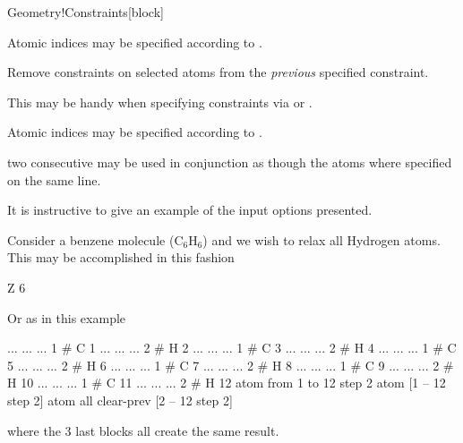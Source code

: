 \begin{fdfentry}{Geometry!Constraints}[block]
\begin{fdfoptions}
    Atomic indices may be specified according to .

    Remove constraints on selected atoms from the \emph{previous} specified
    constraint.

    This may be handy when specifying constraints via  or
    .

    Atomic indices may be specified according to .

    \note two consecutive  may be used in conjunction
    as though the atoms where specified on the same line.

  \end{fdfoptions}

  It is instructive to give an example of the input options presented.

  Consider a benzene molecule ($\mathrm{C}_6\mathrm{H}_6$) and we wish
  to relax all Hydrogen atoms. This may be accomplished in this fashion
  \begin{fdfexample}
      Z 6
  \end{fdfexample}
  Or as in this example
  \begin{fdfexample}
      ... ... ... 1   # C 1
      ... ... ... 2   # H 2
      ... ... ... 1   # C 3
      ... ... ... 2   # H 4
      ... ... ... 1   # C 5
      ... ... ... 2   # H 6
      ... ... ... 1   # C 7
      ... ... ... 2   # H 8
      ... ... ... 1   # C 9
      ... ... ... 2   # H 10
      ... ... ... 1   # C 11
      ... ... ... 2   # H 12
      atom from 1 to 12 step 2
      atom [1 -- 12 step 2]
      atom all
      clear-prev [2 -- 12 step 2]
  \end{fdfexample}
  where the 3 last blocks all create the same result.


\end{fdfentry}
